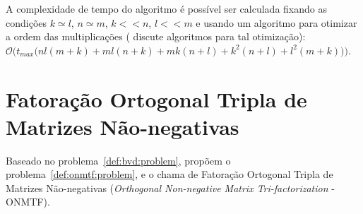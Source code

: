 \documentclass[
    12pt,                %
    oneside,            %
    a4paper,            %
    english,            %
    brazil                %
    ]{abntex2ppgsi}
\newtheorem{theorem}{Teorema}
\begin{document}
A complexidade de tempo do algoritmo é possível ser calculada fixando as condições $k \simeq l$, $n \simeq m$, $k << n$, $l << m$ e usando um algoritmo para otimizar a ordem das multiplicações ( discute algoritmos para tal otimização): $\mathcal{O}\Big( t_{max} \big( nl (m + k) + ml (n + k) + mk (n + l) + k^2 (n + l) + l^2 (m + k) \big) \Big)$.






\section{Fatoração Ortogonal Tripla de Matrizes Não-negativas}
\label{sec:ONMTF}

Baseado no problema~\ref{def:bvd:problem},  propõem o problema~\ref{def:onmtf:problem}, e o chama de Fatoração Ortogonal Tripla de Matrizes Não-negativas (\textit{Orthogonal Non-negative Matrix Tri-factorization} - ONMTF).
\end{document}
